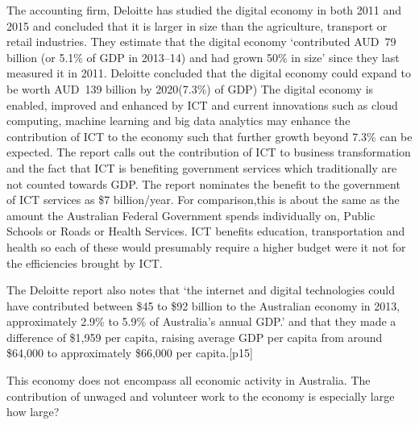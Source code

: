 The accounting firm, Deloitte has studied the digital economy in both 2011 and 2015 and concluded that it is larger in size than the agriculture, transport or retail industries. They estimate that the digital economy `contributed AUD~79 billion (or 5.1\% of GDP in 2013--14) and had grown 50\% in size' since they last measured it in 2011. Deloitte concluded that the digital economy could expand to be worth AUD~139 billion by 2020(7.3\%) of GDP)\cite[p1]{RefWorks:274} The digital economy is enabled, improved and enhanced by ICT and current innovations such as cloud computing, machine learning and big data analytics may enhance the contribution of ICT to the economy such that further growth beyond 7.3\% can be expected. The report calls out the contribution of ICT to business transformation and the fact that ICT is benefiting government services which traditionally are not counted towards GDP. The report nominates the benefit to the government of ICT services as \$7 billion/year. For comparison,this is about the same as the amount the Australian Federal Government spends individually on, Public Schools or Roads or Health Services\cite{RefWorks:276}. ICT benefits education, transportation and health so each of these would presumably require a higher budget were it not for the efficiencies brought by ICT.

The Deloitte report also notes that `the internet and digital technologies could have contributed between \$45 to \$92 billion to the Australian economy in 2013, approximately 2.9\% to 5.9\% of Australia's annual GDP.'\cite[p14]{RefWorks:275} and that they made a difference of \$1,959 per capita, raising average GDP per capita from around \$64,000 to approximately \$66,000 per capita.[p15]


This economy does not encompass all economic activity in Australia. The contribution of unwaged and volunteer work to the economy is especially large {\color{red} how large?}

